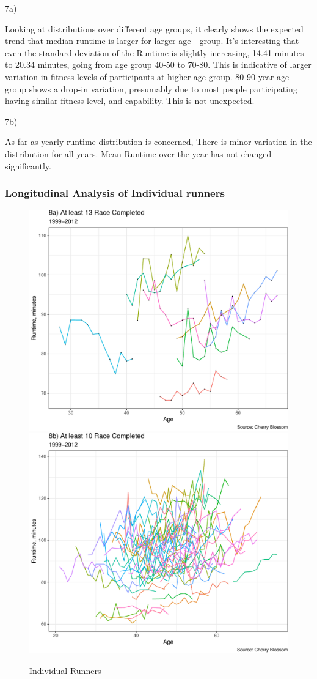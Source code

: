 \documentclass[
]{article}
\begin{document}
\hfill\break
7a)

Looking at distributions over different age groups, it clearly shows the
expected trend that median runtime is larger for larger age - group.
It's interesting that even the standard deviation of the Runtime is
slightly increasing, 14.41 minutes to 20.34 minutes, going from age
group 40-50 to 70-80. This is indicative of larger variation in fitness
levels of participants at higher age group. 80-90 year age group shows a
drop-in variation, presumably due to most people participating having
similar fitness level, and capability. This is not unexpected.

7b)

As far as yearly runtime distribution is concerned, There is minor
variation in the distribution for all years. Mean Runtime over the year
has not changed significantly.

\hypertarget{longitudinal-analysis-of-individual-runners}{%
\subsubsection{Longitudinal Analysis of Individual
runners}\label{longitudinal-analysis-of-individual-runners}}

\begin{figure}[H]

\includegraphics[width=.49\linewidth,]{case_study02_files/figure-latex/unnamed-chunk-16-1} \includegraphics[width=.49\linewidth,]{case_study02_files/figure-latex/unnamed-chunk-16-2} \hfill{}

\caption{Individual Runners}\label{fig:unnamed-chunk-16}
\end{figure}
\end{document}
